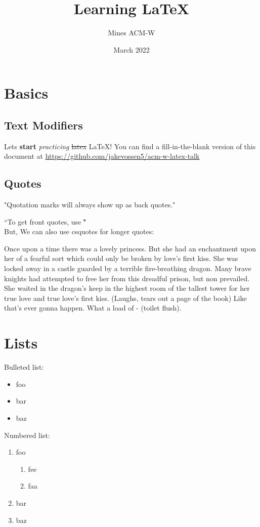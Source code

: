 \documentclass{article}
\begin{document}
\title{Learning \LaTeX}
\author{Mines ACM-W}
\date{March 2022}

\maketitle
\tableofcontents
\newpage

\section{Basics}
\subsection{Text Modifiers}
Lets \textbf{start} \textit{practicing} \sout{latex} \LaTeX! You can find a fill-in-the-blank version of this document at \url{https://github.com/jakevossen5/acm-w-latex-talk}
\subsection{Quotes}
"Quotation marks will always show up as back quotes."

``To get front quotes, use \`\`"\\

But,  We can also use csquotes for longer quotes:
\begin{displayquote}
Once upon a time there was a lovely princess. But she had an enchantment upon her of a fearful sort which could only be broken by love's first kiss. She was locked away in a castle guarded by a terrible fire-breathing dragon. Many brave knights had attempted to free her from this dreadful prison, but non prevailed. She waited in the dragon's keep in the highest room of the tallest tower for her true love and true love's first kiss. (Laughs, tears out a page of the book) Like that's ever gonna happen. What a load of - (toilet flush).
\end{displayquote}


\section{Lists}
Bulleted list:
\begin{itemize}
    \item foo
    \item bar
    \item baz
\end{itemize}
Numbered list:
\begin{enumerate}
    \item foo
    \begin{enumerate}
        \item fee
        \item faa
    \end{enumerate}
    \item bar
    \item baz
\end{enumerate}
\end{document}
